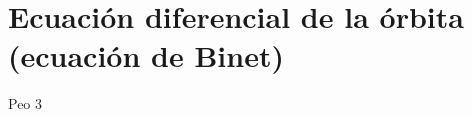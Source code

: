 \documentclass[../main.tex]{subfiles}
\begin{document}
\section{Ecuación diferencial de la órbita (ecuación de Binet)}
Peo 3
 
\end{document}
